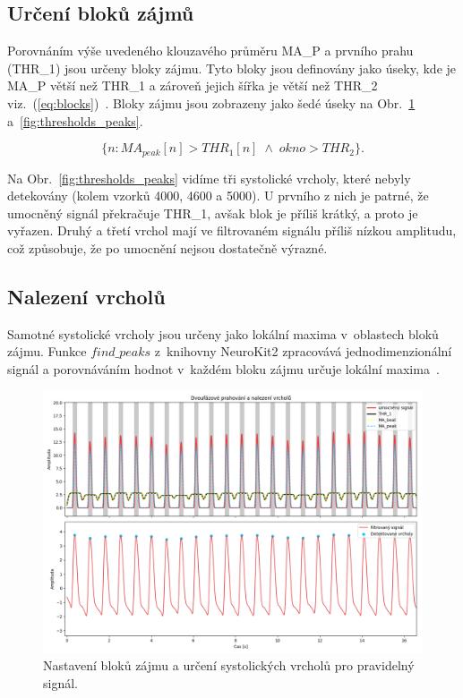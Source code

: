 \subsection*{Určení bloků zájmů}
\label{sec:blocks}
Porovnáním výše uvedeného klouzavého průměru \acs{MA_P} a prvního prahu (\acs{THR_1}) jsou určeny bloky zájmu.
Tyto bloky jsou definovány jako úseky, kde je \acs{MA_P} větší než \acs{THR_1} a zároveň jejich šířka je větší než \acs{THR_2} viz.~(\ref{eq:blocks})~\cite{Elgendi2013}.
Bloky zájmu jsou zobrazeny jako šedé úseky na Obr.~\ref{fig:thresholds_peaks_clean} a~\ref{fig:thresholds_peaks}.

\begin{equation}
	\{n : MA_{peak}[n] > THR_1[n] \; \land \; okno > THR_2\}.
	\label{eq:blocks}
\end{equation}

Na Obr.~\ref{fig:thresholds_peaks} vidíme tři systolické vrcholy, které nebyly detekovány (kolem vzorků 4000, 4600 a 5000).
U prvního z nich je patrné, že umocněný signál překračuje \acs{THR_1}, avšak blok je příliš krátký, a proto je vyřazen.
Druhý a třetí vrchol mají ve filtrovaném signálu příliš nízkou amplitudu, což způsobuje, že po umocnění nejsou dostatečně výrazné.

\subsection*{Nalezení vrcholů}
\label{sec:peaks}

Samotné systolické vrcholy jsou určeny jako lokální maxima v~oblastech bloků zájmu.
Funkce \(find\_peaks\) z~knihovny NeuroKit2 zpracovává jednodimenzionální signál a porovnáváním hodnot v~každém bloku zájmu určuje lokální maxima~\cite{NeuroKit2}.

\begin{figure}[t]
	\vspace{-9mm}
	\centering
	\includegraphics[width=1\textwidth]{./obrazky/Elgendi_THR_Peaks_Clean.png}
	\vspace{-10mm}
	\caption[Elgendiho zpracování pravidelného signálu]{Nastavení bloků zájmu a určení systolických vrcholů pro pravidelný signál.}
	\label{fig:thresholds_peaks_clean}
\end{figure}


